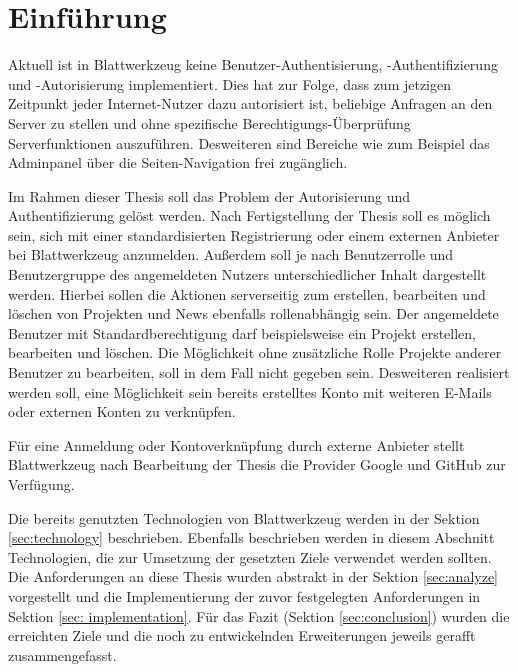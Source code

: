 \section{Einführung}
\label{sec:introduction}
Aktuell ist in Blattwerkzeug keine Benutzer-Authentisierung, -Authentifizierung und -Autorisierung implementiert. Dies hat zur Folge, dass zum jetzigen Zeitpunkt jeder Internet-Nutzer dazu autorisiert ist, beliebige Anfragen an den Server zu stellen und ohne spezifische Berechtigungs-Überprüfung Serverfunktionen auszuführen. Desweiteren sind Bereiche wie zum Beispiel das Adminpanel über die Seiten-Navigation frei zugänglich. 

Im Rahmen dieser Thesis soll das Problem der Autorisierung und Authentifizierung gelöst werden. Nach Fertigstellung der Thesis soll es möglich sein, sich mit einer standardisierten Registrierung oder einem externen Anbieter bei Blattwerkzeug anzumelden. Au{\ss}erdem soll je nach Benutzerrolle und Benutzergruppe des angemeldeten Nutzers unterschiedlicher Inhalt dargestellt werden. Hierbei sollen die Aktionen serverseitig zum erstellen, bearbeiten und löschen von Projekten und News ebenfalls rollenabhängig sein. Der angemeldete Benutzer mit Standardberechtigung darf beispielsweise ein Projekt erstellen, bearbeiten und löschen. Die Möglichkeit ohne zusätzliche Rolle Projekte anderer Benutzer zu bearbeiten, soll in dem Fall nicht gegeben sein. Desweiteren realisiert werden soll, eine Möglichkeit sein bereits erstelltes Konto mit weiteren E-Mails oder externen Konten zu verknüpfen. 

Für eine Anmeldung oder Kontoverknüpfung durch externe Anbieter stellt Blattwerkzeug nach Bearbeitung der Thesis die Provider Google und GitHub zur Verfügung.

Die bereits genutzten Technologien von Blattwerkzeug werden in der Sektion \ref{sec:technology} beschrieben. Ebenfalls beschrieben werden in diesem Abschnitt Technologien, die zur Umsetzung der gesetzten Ziele verwendet werden sollten. Die Anforderungen an diese Thesis wurden abstrakt in der Sektion \ref{sec:analyze} vorgestellt und die Implementierung der zuvor festgelegten Anforderungen in Sektion \ref{sec: implementation}. Für das Fazit (Sektion \ref{sec:conclusion}) wurden die erreichten Ziele und die noch zu entwickelnden Erweiterungen jeweils gerafft zusammengefasst.

